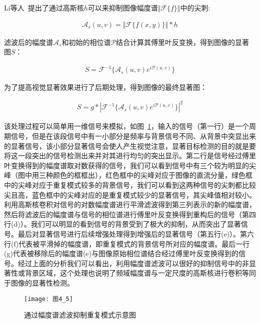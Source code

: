 Li等人~\cite{LiJianTPAMI2013Scale}提出了通过高斯核$h$可以来抑制图像幅度谱$\Vert \mathcal{F}\{f\}\Vert$中的尖刺:
\begin{linenomath}
\begin{align}
\mathcal{A}_{s}(u,v)=\Vert \mathcal{F}\{f(x,y)\}\Vert\ast h
\label{式4_2}
\end{align}
\end{linenomath}
滤波后的幅度谱$\mathcal{A}_{s}$和初始的相位谱$\mathcal{P}$结合计算其傅里叶反变换，得到图像的显著图$S$：
\begin{linenomath}
\begin{align}
S=\mathcal{F}^{-1}\{\mathcal{A}_{s}(u,v)e^{i\mathcal{P}(u,v)}\}
\label{式4_3}
\end{align}
\end{linenomath}
为了提高视觉显著效果进行了后期处理，得到图像的最终显著图：
\begin{linenomath}
\begin{align}
S=g*|\mathcal{F}^{-1}\{\mathcal{A}_{s}(u,v)e^{i\mathcal{P}(u,v)}\}|^{2}
\label{式4_4}
\end{align}
\end{linenomath}
该处理过程可以简单用一维信号来模拟，如图~\ref{图4_5}，输入的信号（第一行）是一个周期信号，但是在该段信号中有一小部分是频率与背景信号不同、从背景中突显出来的显著信号，该小部分显著信号会使人产生视觉注意，显著目标检测的目的就是要将这一段突出的信号检测出来并对其进行均匀的突出显示。第二行是信号经过傅里叶变换得到的幅度谱取对数获得的信号，我们可以看到信号中有三个较为明显的尖峰（图中用三种颜色的框框出），红色框中的尖峰对应于图像的直流分量，绿色框中的尖峰对应于重复模式较多的背景信号，我们可以看到这两种信号的尖刺都比较尖且高，蓝色框中的尖峰对应的是重复模式较少的显著信号，其尖峰值相对较小。利用高斯核卷积对信号的对数幅度谱进行平滑滤波得到第三列表示的新的幅度谱，然后将滤波后的幅度谱与信号的相位谱进行傅里叶反变换得到重构后的信号（第四行(d)）。我们可以明显的看到信号的背景受到了极大的抑制，从而突出了显著信号。最后对显著信号进行后续增强处理得到增强后的显著信号（第五行(e)）。第六行(f)代表被平滑掉的幅度谱，即重复模式的背景信号所对应的幅度谱。最后一行(g)代表被移除后的幅度谱(e)与图像原始相位谱结合经过傅里叶反变换得到的信号。经过上面的分析我们可以看出，利用幅度谱滤波可以很好的抑制信号中的非显著性或背景区域，这个处理也说明了频域幅度谱与一定尺度的高斯核进行卷积等同于图像的显著性检测。
\begin{figure}[h]
  \centering
  \texttt{[image: 图4\_5]}
  \caption{通过幅度谱滤波抑制重复模式示意图}   
  \label{图4_5} 
\end{figure}


